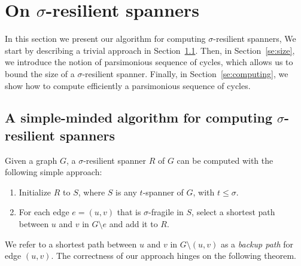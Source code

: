 \documentclass{article}
\newcommand{\dist}          {d}
\newcommand{\frag}          {\mathrm{frag}}
\newtheorem{remark}[theorem]{Remark}
\newcommand{\qed}{\hfill \ensuremath{\Box}}
\newenvironment{proof}{\vspace{1ex}\noindent{\bf Proof.}\hspace{0.5em}}
	{\hfill\qed\vspace{2ex}}
\newcommand{\commento}[1] {}
\begin{document}
\section{On $\sigma$-resilient spanners}
\label{se:spanners}

In this section we present our algorithm for computing $\sigma$-resilient spanners,
We start by describing a trivial approach in Section~\ref{se:trivial}. Then, in Section~\ref{se:size}, we introduce the notion of parsimonious sequence of cycles, which allows us to bound the size of a $\sigma$-resilient spanner. Finally, in Section~\ref{se:computing}, we show how to compute efficiently a parsimonious sequence of cycles.

\subsection{A simple-minded algorithm for computing $\sigma$-resilient spanners}\label{se:trivial}
Given a graph $G$, a $\sigma$-resilient spanner $R$ of $G$ can be computed with the following simple approach:

\begin{enumerate}
	\item Initialize $R$ to $S$, where $S$ is any $t$-spanner of $G$, with $t \leq\sigma$.
	\item For each  edge $e=(u,v)$ that is $\sigma$-fragile in $S$, 
	select a shortest path between $u$ and $v$ in $G\setminus e$ and add it to $R$.
\end{enumerate}

We refer to a shortest path between $u$ and $v$ in $G\setminus (u,v)$ as a \emph{backup path} for edge $(u,v)$. The correctness of our approach hinges on the following theorem.

\commento{
\begin{remark}\label{le:monotone}
Let $G=(V,E)$ be any weighted graph, and let  $G_1=(V,E_1)$ and $G_2=(V,E_{2})$ be any two subgraphs of $G$, with $E_{1} \subseteq E_{2} \subseteq E$. Then, $\frag_{G_2}(e) \leq \frag_{G_1}(e)$ for each edge $e \in E_1$.
\end{remark}
\begin{proof}
Consider an edge $e=(u,v) \in G_1$. Since $E_{1} \subseteq E_{2} $,  $\dist_{G_2}(u,v) \leq \dist_{G_1}(u,v)$.
If $\dist_{G_2}(u,v) < \dist_{G_1}(u,v)$, a shortest path from $u$ to $v$ in $G_2$ avoids edge $e$. This is equivalent to saying that $\dist_{G_2 \setminus e}(u,v) = \dist_{G_2}(u,v)$, and hence $\frag_{G_2}(e) = 1 \leq \frag_{G_1}(e)$.
Otherwise, $\dist_{G_2}(u,v) = \dist_{G_1}(u,v)$ and $\dist_{G_2 \setminus e}(u,v) \leq \dist_{G_1\setminus e}(u,v)$: again, $\frag_{G_2}(e) \leq \frag_{G_1}(e)$. 
\end{proof}
}
\end{document}
